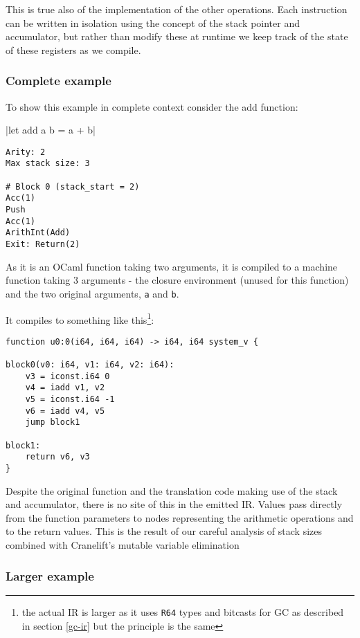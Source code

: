 This is true also of the implementation of the other operations. Each instruction can be written in
isolation using the concept of the stack pointer and accumulator, but rather than modify these at
runtime we keep track of the state of these registers as we compile.

\subsubsection{Complete example}

To show this example in complete context consider the add function:

|let add a b = a + b|

\begin{verbatim}
Arity: 2
Max stack size: 3

# Block 0 (stack_start = 2)
Acc(1)
Push
Acc(1)
ArithInt(Add)
Exit: Return(2)
\end{verbatim}

As it is an OCaml function taking two arguments, it is compiled to a machine function taking 3
arguments - the closure environment (unused for this function) and the two original arguments,
\texttt{a} and \texttt{b}.

It compiles to something like this\footnote{the actual IR is larger as it uses \texttt{R64} types
      and bitcasts for GC as
      described in section \ref{gc-ir} but the principle is the same}:

\begin{verbatim}
function u0:0(i64, i64, i64) -> i64, i64 system_v {

block0(v0: i64, v1: i64, v2: i64):
    v3 = iconst.i64 0
    v4 = iadd v1, v2
    v5 = iconst.i64 -1
    v6 = iadd v4, v5
    jump block1

block1:
    return v6, v3
}
\end{verbatim}

Despite the original function and the translation code making use of the stack and accumulator,
there is no site of this in the emitted IR. Values pass directly from the function parameters to
nodes representing the arithmetic operations and to the return values. This is the result of our
careful analysis of stack sizes combined with Cranelift's mutable variable elimination

\subsubsection{Larger example}

